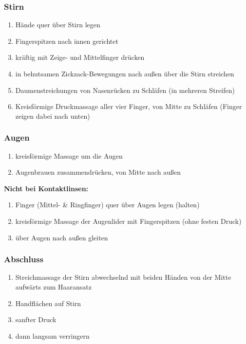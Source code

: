 \subsubsection{Stirn}
\begin{enumerate}
\item Hände quer über Stirn legen
\item Fingerspitzen nach innen gerichtet
\item kräftig mit Zeige- und Mittelfinger drücken
\item in behutsamen Zickzack-Bewegungen nach außen über die Stirn streichen
\item Daumenstreichungen von Nasenrücken zu Schläfen (in mehreren Streifen)
\item Kreisförmige Druckmassage aller vier Finger, von Mitte zu Schläfen (Finger zeigen dabei nach unten)
\end{enumerate}

\subsubsection{Augen}
\begin{enumerate}
\item kreisförmige Massage um die Augen
\item Augenbrauen zusammendrücken, von Mitte nach außen
\end{enumerate}

\textbf{Nicht bei Kontaktlinsen:}
\begin{enumerate}
\item Finger (Mittel- \& Ringfinger) quer über Augen legen (halten)
\item kreisförmige Massage der Augenlider mit Fingerspitzen (ohne festen Druck)
\item über Augen nach außen gleiten
\end{enumerate}

\subsubsection{Abschluss}
\begin{enumerate}
\item Streichmassage der Stirn abwechselnd mit beiden Händen von der Mitte aufwärts zum Haaransatz
\item Handflächen auf Stirn
\item sanfter Druck
\item dann langsam verringern
\end{enumerate}
